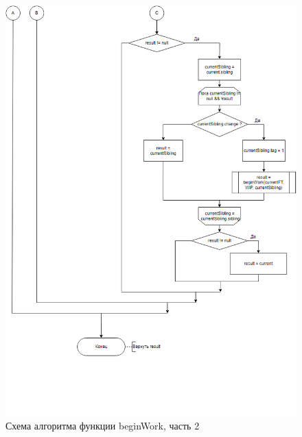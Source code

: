 \begin{figure}[h]
	\centering
	\includegraphics[width=170mm]{img/fiber-begin-work-2.png}
	\caption{Схема алгоритма функции beginWork, часть 2}
	\label{fig:fiber-begin-work-2}
\end{figure}

